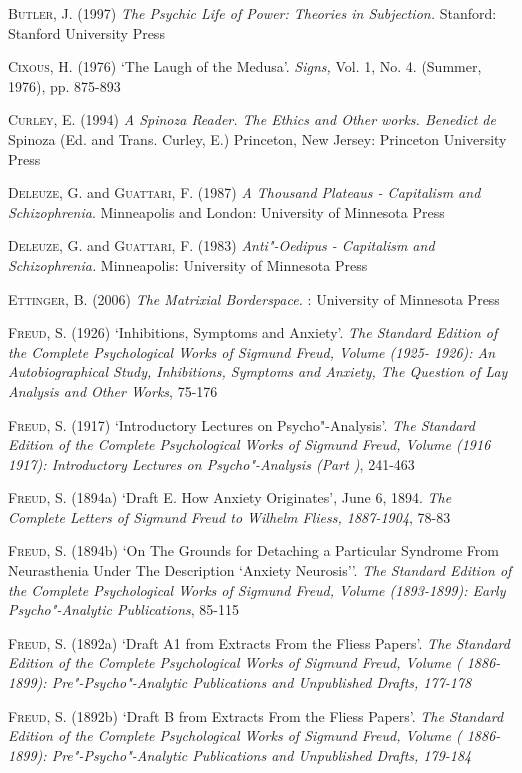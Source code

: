 \textsc{Butler}, J. (1997) \emph{The Psychic Life of Power: Theories in
Subjection.} Stanford: Stanford University Press

\textsc{Cixous}, H. (1976) `The Laugh of the Medusa'. \emph{Signs,} Vol. 1, No.
4. (Summer, 1976), pp. 875-893

\textsc{Curley}, E. (1994) \emph{A Spinoza Reader. The Ethics and Other works.
Benedict de} Spinoza (Ed. and Trans. Curley, E.) Princeton, New Jersey:
Princeton University Press

\textsc{Deleuze}, G. and \textsc{Guattari}, F. (1987) \emph{A Thousand Plateaus -
Capitalism and Schizophrenia}. Minneapolis and London: University of
Minnesota Press

\textsc{Deleuze}, G. and \textsc{Guattari}, F. (1983) \emph{Anti"-Oedipus - Capitalism and
Schizophrenia.} Minneapolis: University of Minnesota Press

\textsc{Ettinger}, B. (2006) \emph{The Matrixial Borderspace.} : University of
Minnesota Press

\textsc{Freud}, S. (1926) `Inhibitions, Symptoms and Anxiety'. \emph{The Standard
Edition of the Complete Psychological Works of Sigmund Freud, Volume 
(1925- 1926): An Autobiographical Study, Inhibitions, Symptoms and
Anxiety, The Question of Lay Analysis and Other Works}, 75-176

\textsc{Freud}, S. (1917) `Introductory Lectures on Psycho"-Analysis'. \emph{The
Standard Edition of the Complete Psychological Works of Sigmund Freud,
Volume  (1916 1917): Introductory Lectures on Psycho"-Analysis (Part
)}, 241-463

\textsc{Freud}, S. (1894a) `Draft E. How Anxiety Originates', June 6, 1894.
\emph{The Complete Letters of Sigmund Freud to Wilhelm Fliess,
1887-1904}, 78-83

\textsc{Freud}, S. (1894b) `On The Grounds for Detaching a Particular Syndrome
From Neurasthenia Under The Description `Anxiety Neurosis''. \emph{The
Standard Edition of the Complete Psychological Works of Sigmund Freud,
Volume  (1893-1899): Early Psycho"-Analytic Publications}, 85-115

\textsc{Freud}, S. (1892a) `Draft A1 from Extracts From the Fliess Papers'.
\emph{The Standard Edition of the Complete Psychological Works of
Sigmund Freud, Volume  ( 1886-1899): Pre"-Psycho"-Analytic Publications
and Unpublished Drafts, 177-178}

\textsc{Freud}, S. (1892b) `Draft B from Extracts From the Fliess Papers'.
\emph{The Standard Edition of the Complete Psychological Works of
Sigmund Freud, Volume  ( 1886-1899): Pre"-Psycho"-Analytic Publications
and Unpublished Drafts, 179-184}

